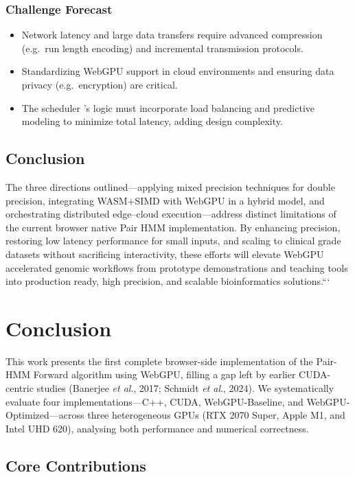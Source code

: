 \documentclass[PhD]{PHlab-thesis}
\begin{document}
\subsection*{Challenge Forecast}
\begin{itemize}
  \item Network latency and large data transfers require advanced compression (e.g.\ run length encoding) and incremental transmission protocols.
  \item Standardizing WebGPU support in cloud environments and ensuring data privacy (e.g.\ encryption) are critical.
  \item The scheduler 's logic must incorporate load balancing and predictive modeling to minimize total latency, adding design complexity.
\end{itemize}

\section*{Conclusion}

The three directions outlined—applying mixed precision techniques for double precision, integrating WASM+SIMD with WebGPU in a hybrid model, and orchestrating distributed edge–cloud execution—address distinct limitations of the current browser native Pair HMM implementation. By enhancing precision, restoring low latency performance for small inputs, and scaling to clinical grade datasets without sacrificing interactivity, these efforts will elevate WebGPU accelerated genomic workflows from prototype demonstrations and teaching tools into production ready, high precision, and scalable bioinformatics solutions.```





\chapter{Conclusion}

This work presents the first complete browser-side implementation of the Pair-HMM Forward algorithm using WebGPU, filling a gap left by earlier CUDA-centric studies (Banerjee \emph{et al}., 2017; Schmidt \emph{et al}., 2024). We systematically evaluate four implementations—C++, CUDA, WebGPU-Baseline, and WebGPU-Optimized—across three heterogeneous GPUs (RTX 2070 Super, Apple M1, and Intel UHD 620), analysing both performance and numerical correctness.

\section{Core Contributions}
\end{document}
